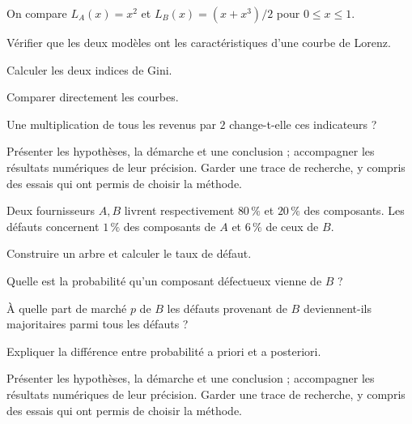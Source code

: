 \label{projet-5}
On compare $L_A(x)=x^2$ et $L_B(x)=(x+x^3)/2$ pour $0\leq x\leq1$.
\begin{questions}
\item Vérifier que les deux modèles ont les caractéristiques d’une courbe de Lorenz.
\item Calculer les deux indices de Gini.
\item Comparer directement les courbes.
\item Une multiplication de tous les revenus par $2$ change-t-elle ces indicateurs ?
\end{questions}
\vspace{5mm}\noindent Présenter les hypothèses, la démarche et une conclusion ; accompagner les résultats numériques de leur précision. Garder une trace de recherche, y compris des essais qui ont permis de choisir la méthode.\par\vfill{}\par\vspace{2mm}\noindent{}
\label{projet-6}
Deux fournisseurs $A,B$ livrent respectivement $80\,\%$ et $20\,\%$ des composants. Les défauts concernent $1\,\%$ des composants de $A$ et $6\,\%$ de ceux de $B$.
\begin{questions}
\item Construire un arbre et calculer le taux de défaut.
\item Quelle est la probabilité qu’un composant défectueux vienne de $B$ ?
\item À quelle part de marché $p$ de $B$ les défauts provenant de $B$ deviennent-ils majoritaires parmi tous les défauts ?
\item Expliquer la différence entre probabilité a priori et a posteriori.
\end{questions}
\vspace{5mm}\noindent Présenter les hypothèses, la démarche et une conclusion ; accompagner les résultats numériques de leur précision. Garder une trace de recherche, y compris des essais qui ont permis de choisir la méthode.\par\vfill{}\par\vspace{2mm}\noindent{}
